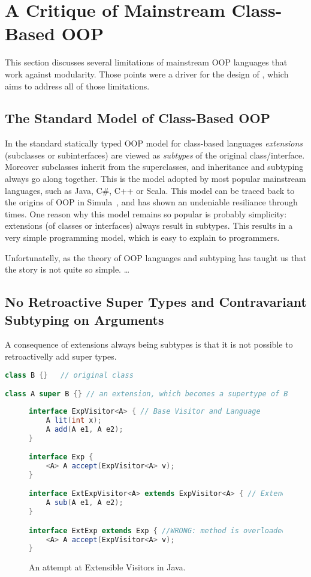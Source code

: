 \section{A Critique of Mainstream Class-Based OOP}
\label{sec:critique}

This section discusses several limitations of mainstream OOP languages
that work against modularity. Those points were a driver for the
design of \name, which aims to address all of those limitations. 

\subsection{The Standard Model of Class-Based OOP}

In the standard statically typed OOP model for class-based languages
\emph{extensions} (subclasses or subinterfaces) are viewed as \emph{subtypes} of the original
class/interface. Moreover subclasses inherit from the superclasses,
and inheritance and subtyping always go along together.
This is the model adopted by most popular mainstream
languages, such as Java, C\#, C++ or Scala. This model can be traced
back to the origins of OOP in Simula~\cite{}, and has shown an 
undeniable resiliance through times. One reason why this model remains 
so popular is probably simplicity: 
extensions (of classes or interfaces) always result in subtypes.  
This results in a very simple programming model, which is easy 
to explain to programmers.  

Unfortunatelly, as the theory of OOP languages and subtyping has taught 
us that the story is not quite so simple.  \ldots

\subsection{No Retroactive Super Types and Contravariant Subtyping on Arguments}

A consequence of extensions always being subtypes is that it is not
possible to retroactivelly add super types. 

\begin{lstlisting}[language=java]
class B {}   // original class

class A super B {} // an extension, which becomes a supertype of B
\end{lstlisting}

\begin{figure}
\begin{lstlisting}[language=java]
interface ExpVisitor<A> { // Base Visitor and Language
	A lit(int x);
	A add(A e1, A e2);
}

interface Exp {
	<A> A accept(ExpVisitor<A> v);
}

interface ExtExpVisitor<A> extends ExpVisitor<A> { // Extended Visitor and Language
	A sub(A e1, A e2);
}

interface ExtExp extends Exp { //WRONG: method is overloaded, not overriden!
	<A> A accept(ExpVisitor<A> v); 
}
\end{lstlisting}
\caption{An attempt at Extensible Visitors in Java.}
\label{fig:JVis}
\end{figure}

